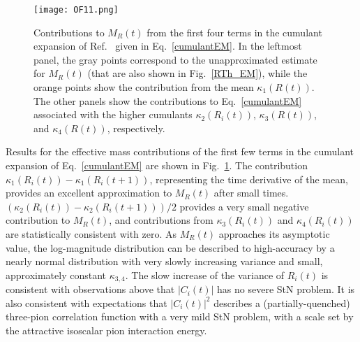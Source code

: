 %
\begin{figure}[!ht]
  \centering
  \texttt{[image: OF11.png]}
  \caption{
  Contributions to $M_R(t)$ from the first four terms in the cumulant expansion of Ref.~\cite{Endres:2011jm} 
  given in Eq.~\eqref{cumulantEM}. In the leftmost panel, the gray points correspond to the unapproximated 
  estimate for $M_R(t)$ (that are also shown in  Fig.~\ref{RTh_EM}),
  while the orange points show the contribution from the mean $\kappa_1(R(t))$. 
  The other panels show the contributions to Eq.~\eqref{cumulantEM} associated with the 
  higher cumulants
  $\kappa_2(R_i(t))$, $\kappa_3(R(t))$, and $\kappa_4(R(t))$, respectively.
  }
  \label{RCumulantEM}
\end{figure}
%
Results for the effective mass contributions of the first few terms in the cumulant expansion of Eq.~\eqref{cumulantEM} 
are shown in Fig.~\ref{RCumulantEM}. 
The contribution $\kappa_1(R_i(t)) - \kappa_1(R_i(t+1))$, 
representing the time derivative of the mean, provides an excellent approximation to $M_R(t)$ after small times. 
$(\kappa_2(R_i(t)) - \kappa_2(R_i(t+1)))/2$ provides a very small negative contribution to $M_R(t)$, and contributions  
from $\kappa_3(R_i(t))$ and $\kappa_4(R_i(t))$ are statistically consistent with zero. 
As $M_R(t)$ approaches its asymptotic value, the log-magnitude distribution can be described to high-accuracy by a 
nearly normal distribution with very slowly increasing variance and small, approximately 
constant  $\kappa_{3,4}$. 
The slow increase of the variance of $R_i(t)$ is consistent with observations above that $|C_i(t)|$ has no severe StN problem.
It is also consistent with expectations that $|C_i(t)|^2$ describes a (partially-quenched) three-pion correlation function with a very mild StN problem, 
with a  scale  set by the attractive isoscalar pion interaction energy.



